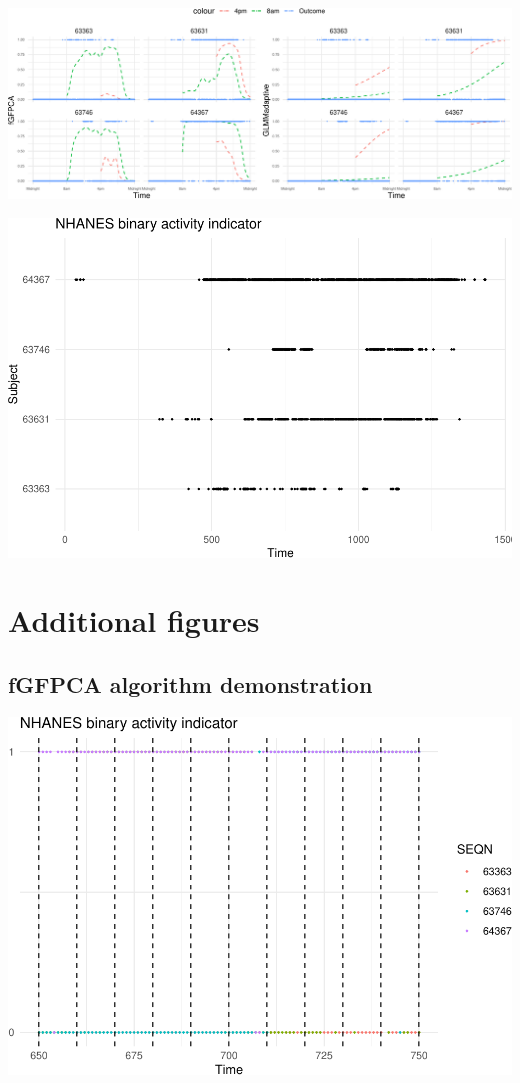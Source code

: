 \documentclass[
]{article}
\begin{document}
\includegraphics{manuscript_files/figure-latex/pred_nhanes-1.pdf}

\includegraphics{manuscript_files/figure-latex/small_exp-1.pdf}

\hypertarget{additional-figures}{%
\section{Additional figures}\label{additional-figures}}

\hypertarget{fgfpca-algorithm-demonstration}{%
\subsection{fGFPCA algorithm
demonstration}\label{fgfpca-algorithm-demonstration}}

\includegraphics{manuscript_files/figure-latex/binning-1.pdf}
\end{document}
